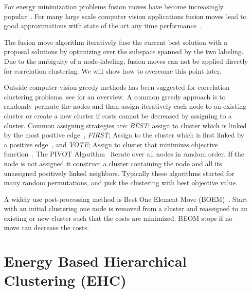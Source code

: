 \documentclass[10pt,twocolumn,letterpaper]{article}
\begin{document}
For energy minimization problems fusion moves have become increasingly popular~\cite{Lempitsky-2010,kappes_2014_ws}.
For many large scale computer vision applications fusion moves lead to good approximations
with state of the art any time performance~\cite{kappes_2014_ws}.

The fusion move algorithm iteratively fuse the current best solution with a proposal solutions
by optimizing over the subspace spanned by the two labeling. 
Due to the ambiguity of a node-labeling, fusion moves can not be applied directly for correlation clustering.
We will show how to overcome this point later.



Outside computer vision greedy methods has been suggested for correlation clustering problems, see \cite{Elsner-2009} for an overview.
A common greedy approach is to randomly permute the nodes and than assign 
iteratively each node to an existing cluster or create a new cluster if costs cannot be decreased by assigning to a cluster.
Common assigning strategies are:
\emph{BEST}; assign to cluster which is linked by the most positive edge~\cite{Ng-2002},
\emph{FIRST}; Assign to the cluster which is first linked by a positive edge~\cite{Soon-2001}, and
\emph{VOTE}; Assign to cluster that minimizes objective function~\cite{Elsner-2008}.
%
The PIVOT Algorithm~\cite{Ailon-2008} iterate over all nodes in random order.
If the node is not assigned it construct a cluster containing the node and all its 
unassigned positively linked neighbors.  
%
Typically these algorithms started for many random permutations, 
and pick the clustering with best objective value.

A widely use post-processing method is  Best One Element Move (BOEM)~\cite{Gionis-2007}.
Start with an initial clustering one node is removed from a cluster and reassigned to an existing or new cluster such that the costs are minimized.
BEOM stops if no move can decrease the costs.



%

\section{Energy Based Hierarchical Clustering (EHC)}
\end{document}
